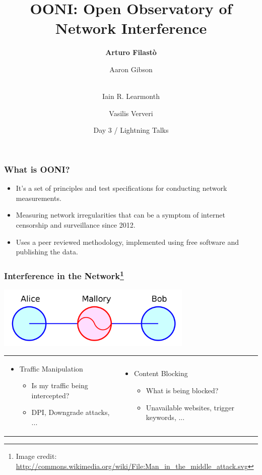 \documentclass{beamer}
\begin{document}
\title[OONI]{OONI: Open Observatory of Network Interference}
\author[Arturo Filast\`{o}]{{\bf Arturo Filast\`{o}} \and
	{Aaron Gibson} \and \\
	{Iain R. Learmonth} \and
	{Vasilis Ververi}}
\date{Day 3 / Lightning Talks} 

\begin{frame}
\maketitle
\end{frame}

\begin{frame}
	\frametitle{What is OONI?}
	\begin{itemize}
		\item{It’s a set of principles and test specifications for
			conducting network measurements.}
		\item{Measuring network irregularities that can be a symptom of
			internet censorship and surveillance since 2012.}
		\item{Uses a peer reviewed methodology, implemented using free
			software and publishing the data.}
	\end{itemize}
\end{frame}

\begin{frame}
	\frametitle{Interference in the Network\footnote{\tiny Image credit: \url{http://commons.wikimedia.org/wiki/File:Man_in_the_middle_attack.svg}}}
	\begin{center}
		\includegraphics[width=0.7\textwidth]{mitm.png}
	\end{center}
	\begin{tabular}{ p{} p{} }
	\begin{itemize}
		\item{Traffic Manipulation}
			\begin{itemize}
				\item{Is my traffic being intercepted?}
				\item{DPI, Downgrade attacks, ...}
			\end{itemize}
		\end{itemize} &
		\begin{itemize}
			\item{Content Blocking}
			\begin{itemize}
				\item{What is being blocked?}
				\item{Unavailable websites, trigger keywords, ...}
			\end{itemize}
		\end{itemize}
\end{tabular}
\end{frame}
\end{document}
